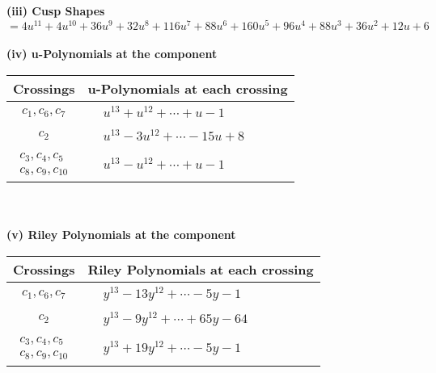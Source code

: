 \documentclass[1p]{elsarticle_modified}
\theoremstyle{definition}
\begin{document}
\flushleft \textbf{(iii) Cusp Shapes $= 4 u^{11}+4 u^{10}+36 u^9+32 u^8+116 u^7+88 u^6+160 u^5+96 u^4+88 u^3+36 u^2+12 u+6$}\\~\\
\newpage\renewcommand{\arraystretch}{1}
\flushleft \textbf{(iv) u-Polynomials at the component}\newline \\
\begin{tabular}{m{50pt}|m{274pt}}
Crossings & \hspace{64pt}u-Polynomials at each crossing \\
\hline $$\begin{aligned}c_{1},c_{6},c_{7}\end{aligned}$$&$\begin{aligned}
&u^{13}+u^{12}+\cdots+u-1
\end{aligned}$\\
\hline $$\begin{aligned}c_{2}\end{aligned}$$&$\begin{aligned}
&u^{13}-3 u^{12}+\cdots-15 u+8
\end{aligned}$\\
\hline $$\begin{aligned}c_{3},c_{4},c_{5}\\c_{8},c_{9},c_{10}\end{aligned}$$&$\begin{aligned}
&u^{13}- u^{12}+\cdots+u-1
\end{aligned}$\\
\hline
\end{tabular}\\~\\
\newpage\renewcommand{\arraystretch}{1}
\flushleft \textbf{(v) Riley Polynomials at the component}\newline \\
\begin{tabular}{m{50pt}|m{274pt}}
Crossings & \hspace{64pt}Riley Polynomials at each crossing \\
\hline $$\begin{aligned}c_{1},c_{6},c_{7}\end{aligned}$$&$\begin{aligned}
&y^{13}-13 y^{12}+\cdots-5 y-1
\end{aligned}$\\
\hline $$\begin{aligned}c_{2}\end{aligned}$$&$\begin{aligned}
&y^{13}-9 y^{12}+\cdots+65 y-64
\end{aligned}$\\
\hline $$\begin{aligned}c_{3},c_{4},c_{5}\\c_{8},c_{9},c_{10}\end{aligned}$$&$\begin{aligned}
&y^{13}+19 y^{12}+\cdots-5 y-1
\end{aligned}$\\
\hline
\end{tabular}\\~\\
\end{document}
